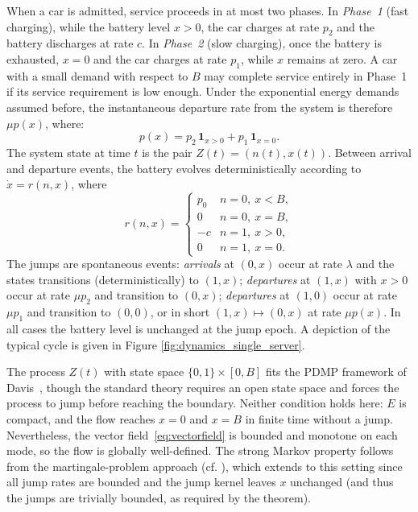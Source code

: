 \documentclass{sig-alternate-per-modified}
\begin{document}
When a car is admitted, service proceeds in at most two phases. In \emph{Phase~1}
(fast charging), while the battery level $x > 0$, the car charges at rate $p_2$ and the
battery discharges at rate $c$. In \emph{Phase~2} (slow charging), once the battery is
exhausted, $x = 0$ and the car charges at rate $p_1$, while $x$ remains at zero. A car with a small demand with respect to $B$ may complete service entirely in Phase~1 if its service requirement is low enough. Under the exponential energy demands assumed before, the instantaneous departure rate from the system is therefore $\mu p(x)$, where:
\begin{equation}\label{eq:power_function}
p(x) = p_2\,\mathbf{1}_{x>0} + p_1\,\mathbf{1}_{x=0}.
\end{equation}
The system state at time $t$ is the pair $Z(t) = (n(t), x(t))$. Between arrival and departure events, the battery evolves deterministically according to $\dot{x} = r(n, x)$, where
\begin{equation}
  r(n, x) = \begin{cases}
    p_0  & n = 0,\ x < B, \\
    0    & n = 0,\ x = B, \\
    -c   & n = 1,\ x > 0, \\
    0    & n = 1,\ x = 0.
  \end{cases}
  \label{eq:vectorfield}
\end{equation}
The jumps are spontaneous events: \emph{arrivals} at $(0,x)$ occur at rate $\lambda$ and
the states transitions (deterministically) to $(1,x)$; \emph{departures} at $(1,x)$ with $x>0$ occur at rate $\mu p_2$
and transition to $(0,x)$; \emph{departures} at $(1,0)$ occur at rate $\mu p_1$ and
transition to $(0,0)$, or in short $(1,x)\mapsto (0,x)$ at rate $\mu p(x)$. In all cases the battery level is unchanged at the jump epoch. A depiction of the typical cycle is given in Figure \ref{fig:dynamics_single_server}.

The process $Z(t)$ with state space $\{0,1\}\times[0,B]$ fits the PDMP framework of Davis~\cite{Davis1984,Davis1993},
though the standard theory requires an open state space and forces the process to jump
before reaching the boundary. Neither condition holds here: $E$ is compact, and the flow
reaches $x=0$ and $x=B$ in finite time without a jump. Nevertheless, the vector
field~\eqref{eq:vectorfield} is bounded and monotone on each mode, so the flow is
globally well-defined. The strong Markov property follows from the martingale-problem
approach (cf. \cite[Theorem~4.8]{Davis1984}), which extends to this setting since all jump rates are bounded and the jump kernel leaves $x$ unchanged
(and thus the jumps are trivially bounded, as required by the theorem).
\end{document}
